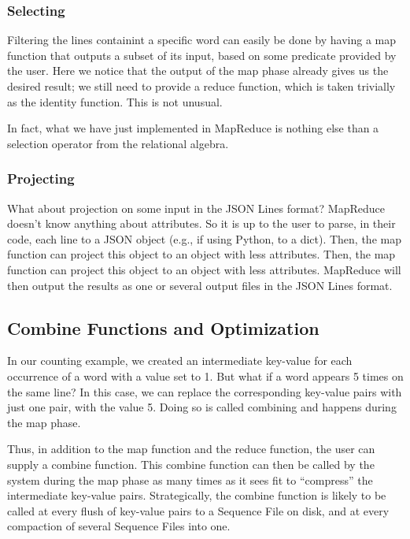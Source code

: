 \subsubsection{Selecting}

Filtering the lines containint a specific word can easily be done by having a map function that outputs a subset of its input, based on some predicate provided by the user. Here we notice that the output of the map phase already gives us the desired result; we still need to provide a reduce function, which is taken trivially as the identity function. This is not unusual.

In fact, what we have just implemented in MapReduce is nothing else than a selection operator from the relational algebra.

\subsubsection{Projecting}

What about projection on some input in the JSON Lines format? MapReduce doesn’t know anything about attributes. So it is up to the user to parse, in their code, each line to a JSON object (e.g., if using Python, to a dict). Then, the map function can project this object to an object with less attributes. Then, the map function can project this object to an object with less attributes. MapReduce will then output the results as one or several output files in the JSON Lines format.

\subsection{Combine Functions and Optimization}

In our counting example, we created an intermediate key-value for each occurrence of a word with a value set to 1. But what if a word appears 5 times on the same line? In this case, we can replace the corresponding key-value pairs with just one pair, with the value 5. Doing so is called combining and happens during the map phase.

Thus, in addition to the map function and the reduce function, the user can supply a combine function. This combine function can then be called by the system during the map phase as many times as it sees fit to “compress” the intermediate key-value pairs. Strategically, the combine function is likely to be called at every flush of key-value pairs to a Sequence File on disk, and at every compaction of several Sequence Files into one.

